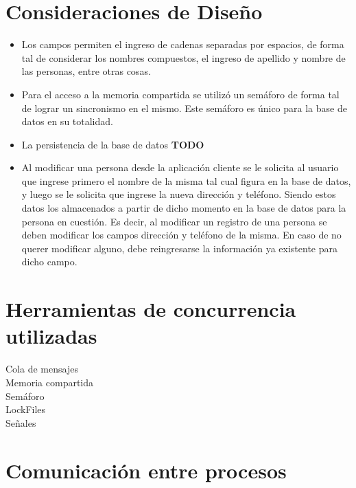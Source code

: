 \documentclass[11pt]{article}
\begin{document}
\section{Consideraciones de Dise\~no}

\begin{itemize}
\item Los campos permiten el ingreso de cadenas separadas por espacios, de forma tal de considerar los nombres compuestos, el ingreso de apellido y 
nombre de las personas, entre otras cosas.
\item Para el acceso a la memoria compartida se utiliz\'o un sem\'aforo de forma tal de lograr un sincronismo en el mismo. Este sem\'aforo es \'unico 
para la base de datos en su totalidad.
\item La persistencia de la base de datos {\bf TODO}
\item Al modificar una persona desde la aplicaci\'on cliente se le solicita al usuario que ingrese primero el nombre de la misma tal cual figura en la base de datos, 
y luego se le solicita que ingrese la nueva direcci\'on y tel\'efono. Siendo estos datos los almacenados a partir de dicho momento 
en la base de datos para la persona en cuesti\'on. Es decir, al modificar un registro de una persona se deben modificar los campos direcci\'on y tel\'efono de 
la misma. En caso de no querer modificar alguno, debe reingresarse la informaci\'on ya existente para dicho campo.

\end{itemize}

\section{Herramientas de concurrencia utilizadas}

Cola de mensajes \\
Memoria compartida \\
Sem\'aforo \\
LockFiles \\
Se\~nales \\

\section {Comunicaci\'on entre procesos}
\end{document}
